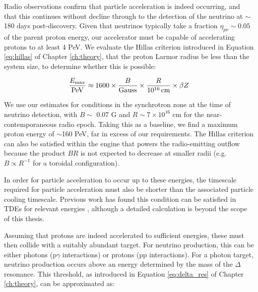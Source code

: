 
Radio observations confirm that particle acceleration is indeed occurring, and that this continues without decline through to the detection of the neutrino at $\sim$180 days post-discovery. Given that neutrinos typically take a fraction $\eta_{p\nu} \sim 0.05$ of the parent proton energy, our accelerator must be capable of accelerating protons to at least 4 PeV. We evaluate the Hillas criterion  introduced in Equation \ref{eq:hillas} of Chapter \ref{ch:theory}, that the proton Larmor radius be less than the system size, to determine whether this is possible:

\begin{equation}
\frac{E_{ \textup{max}}}{ \textup{PeV}} \approx
1600 \times \frac{B}{ \textup{Gauss}} \times \frac{R}{10^{16} \,  \textup{cm}} \times
\beta Z
\end{equation}

We use our estimates for conditions in the synchrotron zone at the time of neutrino detection, with $B \sim$ 0.07 G and $R \sim 7 \times 10^{16}$ cm for the near-contemporaneous radio epoch. Taking this as a baseline, we find a maximum proton energy of $\sim$160 PeV, far in excess of our requirements. The Hillas criterion can also be satisfied within the engine that powers the radio-emitting outflow because the product $BR$ is not expected to decrease at smaller radii (e.g. $B \propto R^{-1}$ for a toroidal configuration). 

In order for particle acceleration to occur up to these energies, the timescale required for particle acceleration must also be shorter than the associated particle cooling timescale. Previous work has found this condition can be satisfied in TDEs for relevant energies , although a detailed calculation is beyond the scope of this thesis.

Assuming that protons are indeed accelerated to sufficient energies, these must then collide with a suitably abundant target. For neutrino production, this can be either photons (p$\gamma$ interactions) or protons (pp interactions). For a photon target, neutrino production occurs above an energy determined by the mass of the $\Delta$ resonance. This threshold, as introduced in Equation \ref{eq:delta_res} of Chapter \ref{ch:theory}, can be approximated as:

